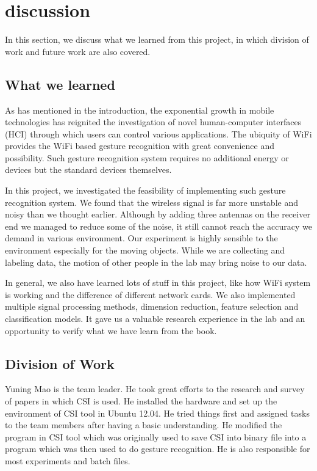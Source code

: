\documentclass[conference]{IEEEtran}
\begin{document}
\section{discussion} \label{section-discussion}

In this section, we discuss what we learned from this project, in which division of work and future work are also covered.

\subsection{What we learned}
As has mentioned in the introduction, the exponential growth in mobile technologies has reignited the investigation of novel human-computer interfaces (HCI) through which users can control various applications. The ubiquity of WiFi provides the WiFi based gesture recognition with great convenience and possibility. Such gesture recognition system requires no additional energy or devices but the standard devices themselves.

In this project, we investigated the feasibility of implementing such gesture recognition system. We found that the wireless signal is far more unstable and noisy than we thought earlier. Although by adding three antennas on the receiver end we managed to reduce some of the noise, it still cannot reach the accuracy we demand in various environment. Our experiment is highly sensible to the environment especially for the moving objects. While we are collecting and labeling data, the motion of other people in the lab may bring noise to our data.

In general, we also have learned lots of stuff in this project, like how WiFi system is working and the difference of different network cards. We also implemented multiple signal processing methods, dimension reduction, feature selection and classification models. It gave us a valuable research experience in the lab and an opportunity to verify what we have learn from the book.

\subsection{Division of Work}
Yuning Mao is the team leader. He took great efforts to the research and survey of papers in which CSI is used. He installed the hardware and set up the environment of CSI tool in Ubuntu 12.04. He tried things first and assigned tasks to the team members after having a basic understanding. He modified the program in CSI tool which was originally used to save CSI into binary file into a program which was then used to do gesture recognition. He is also responsible for most experiments and batch files.
\end{document}
